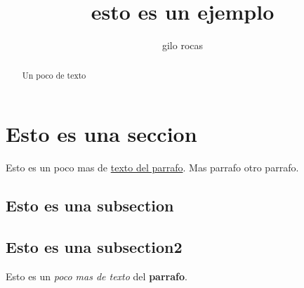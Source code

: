 \documentclass[]{article}
\title{esto es un ejemplo}
\author{gilo rocas}
\begin{document}
\maketitle

\begin{abstract}
    Un poco de texto
\end{abstract}

\section{Esto es una seccion}
Esto es un poco mas de \underline{texto del parrafo}.
Mas parrafo
otro parrafo.
\subsection{Esto es una subsection}
\subsection{Esto es una subsection2}
Esto es un \textit{poco mas de texto} del \textbf{parrafo}.
\end{document}
